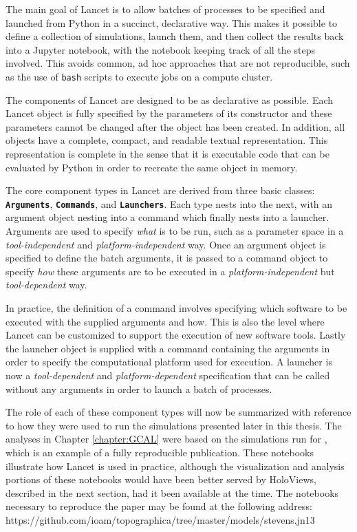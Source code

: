 \documentclass[phd,ianc,twoside]{infthesis}
\newcommand{\tbf}[1]{\texttt{\textbf{#1}}}
\begin{document}
The main goal of Lancet is to allow batches of processes to be specified
and launched from Python in a succinct, declarative way. This makes it
possible to define a collection of simulations, launch them, and then
collect the results back into a Jupyter notebook, with the notebook
keeping track of all the steps involved. This avoids common, ad hoc
approaches that are not reproducible, such as the use of \texttt{bash} scripts to
execute jobs on a compute cluster.

The components of Lancet are designed to be as declarative as
possible. Each Lancet object is fully specified by the parameters of its
constructor and these parameters cannot be changed after the object has
been created. In addition, all objects have a complete, compact, and
readable textual representation. This representation is complete in the
sense that it is executable code that can be evaluated by Python in
order to recreate the same object in memory.

The core component types in Lancet are derived from three basic
classes: \tbf{Arguments}, \tbf{Commands}, and \tbf{Launchers}. Each
type nests into the next, with an argument object nesting into a command
which finally nests into a launcher. Arguments are used to specify
\emph{what} is to be run, such as a parameter space in a
\emph{tool-independent} and \emph{platform-independent} way. Once an
argument object is specified to define the batch arguments, it is passed
to a command object to specify \emph{how} these arguments are to be
executed in a \emph{platform-independent} but \emph{tool-dependent} way.

In practice, the definition of a command involves specifying which
software to be executed with the supplied arguments and how. This is
also the level where Lancet can be customized to support the execution
of new software tools. Lastly the launcher object is supplied with a
command containing the arguments in order to specify the computational
platform used for execution. A launcher is now a \emph{tool-dependent}
and \emph{platform-dependent} specification that can be called without
any arguments in order to launch a batch of processes.

The role of each of these component types will now be summarized with
reference to how they were used to run the simulations presented later
in this thesis. The analyses in Chapter \ref{chapter:GCAL} were based on
the simulations run for \citet{stevens_jn13}, which is an example of a
fully reproducible publication. These notebooks illustrate how Lancet is
used in practice, although the visualization and analysis portions of
these notebooks would have been better served by HoloViews, described in
the next section, had it been available at the time. The notebooks
necessary to reproduce the paper may be found at the following address: \newline
\textsf{https://github.com/ioam/topographica/tree/master/models/stevens.jn13}
\end{document}
